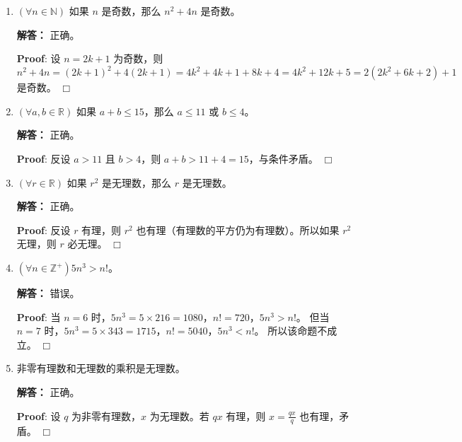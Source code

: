 \documentclass[11pt]{article}
\newenvironment{qparts}{\begin{enumerate}[{(}a{)}]}{\end{enumerate}}
\def\endproofmark{$\Box$}
\newenvironment{proof}{\par{\bf Proof}:}{\endproofmark\smallskip}
\begin{document}
\begin{qparts}
\item $(\forall n \in \mathbb{N})$ 如果 $n$ 是奇数，那么 $n^2 + 4n$ 是奇数。

\textbf{解答：} 正确。\par
\begin{proof}
设 $n=2k+1$ 为奇数，则
\[
n^2 + 4n = (2k+1)^2 + 4(2k+1) = 4k^2 + 4k + 1 + 8k + 4 = 4k^2 + 12k + 5 = 2(2k^2 + 6k + 2) + 1
\]
是奇数。
\end{proof}

\item $(\forall a, b \in \mathbb{R})$ 如果 $a + b \leq 15$，那么 $a \leq 11$ 或 $b \leq 4$。

\textbf{解答：} 正确。\par
\begin{proof}
反设 $a > 11$ 且 $b > 4$，则 $a + b > 11 + 4 = 15$，与条件矛盾。
\end{proof}

\item $(\forall r \in \mathbb{R})$ 如果 $r^2$ 是无理数，那么 $r$ 是无理数。

\textbf{解答：} 正确。\par
\begin{proof}
反设 $r$ 有理，则 $r^2$ 也有理（有理数的平方仍为有理数）。所以如果 $r^2$ 无理，则 $r$ 必无理。
\end{proof}

\item $(\forall n \in \mathbb{Z}^{+}) 5n^3 > n!$。

\textbf{解答：} 错误。\par
\begin{proof}
当 $n=6$ 时，$5n^3 = 5 \times 216 = 1080$，$n! = 720$，$5n^3 > n!$。
但当 $n=7$ 时，$5n^3 = 5 \times 343 = 1715$，$n! = 5040$，$5n^3 < n!$。
所以该命题不成立。
\end{proof}

\item 非零有理数和无理数的乘积是无理数。

\textbf{解答：} 正确。\par
\begin{proof}
设 $q$ 为非零有理数，$x$ 为无理数。若 $qx$ 有理，则 $x = \frac{qx}{q}$ 也有理，矛盾。
\end{proof}
\end{qparts}

\end{document}
